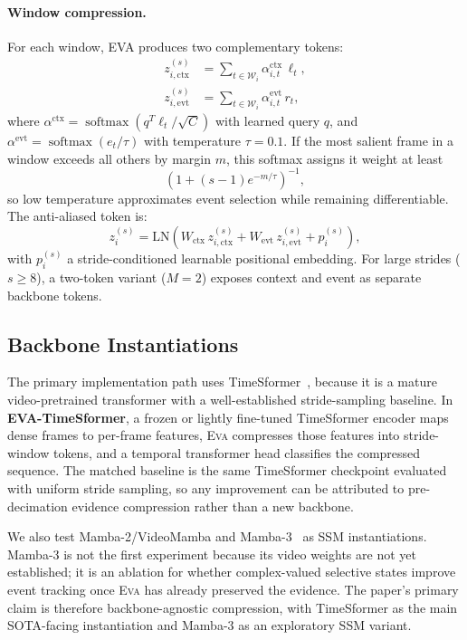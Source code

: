 \documentclass[10pt,twocolumn]{article}
\newcommand{\EVA}{\textsc{Eva}}
\begin{document}
\paragraph{Window compression.}
For each window, EVA produces two complementary tokens:
\begin{align}
    z_{i,\mathrm{ctx}}^{(s)} &= \sum_{t \in \mathcal{W}_i} \alpha_{i,t}^{\mathrm{ctx}}\, \ell_t, \\
    z_{i,\mathrm{evt}}^{(s)} &= \sum_{t \in \mathcal{W}_i} \alpha_{i,t}^{\mathrm{evt}}\, r_t,
\end{align}
where $\alpha^{\mathrm{ctx}} = \operatorname{softmax}(q^T\ell_t/\sqrt{C})$
with learned query $q$, and $\alpha^{\mathrm{evt}} = \operatorname{softmax}(e_t/\tau)$
with temperature $\tau{=}0.1$.
If the most salient frame in a window exceeds all others by margin $m$, this
softmax assigns it weight at least
\[
    \left(1 + (s-1)e^{-m/\tau}\right)^{-1},
\]
so low temperature approximates event selection while remaining differentiable.
The anti-aliased token is:
\begin{equation}
    z_i^{(s)} = \mathrm{LN}\!\left(W_{\mathrm{ctx}}\, z_{i,\mathrm{ctx}}^{(s)}
        + W_{\mathrm{evt}}\, z_{i,\mathrm{evt}}^{(s)} + p_i^{(s)}\right),
\end{equation}
with $p_i^{(s)}$ a stride-conditioned learnable positional embedding.
For large strides ($s \geq 8$), a two-token variant ($M{=}2$) exposes context
and event as separate backbone tokens.

\subsection{Backbone Instantiations}

The primary implementation path uses TimeSformer~\cite{timesformer}, because it
is a mature video-pretrained transformer with a well-established stride-sampling
baseline. In \textbf{EVA-TimeSformer}, a frozen or lightly fine-tuned TimeSformer
encoder maps dense frames to per-frame features, \EVA{} compresses those features
into stride-window tokens, and a temporal transformer head classifies the
compressed sequence. The matched baseline is the same TimeSformer checkpoint
evaluated with uniform stride sampling, so any improvement can be attributed to
pre-decimation evidence compression rather than a new backbone.

We also test Mamba-2/VideoMamba and Mamba-3~\cite{mamba2,mamba3} as SSM
instantiations. Mamba-3 is not the first experiment because its video weights are
not yet established; it is an ablation for whether complex-valued selective
states improve event tracking once \EVA{} has already preserved the evidence.
The paper's primary claim is therefore backbone-agnostic compression, with
TimeSformer as the main SOTA-facing instantiation and Mamba-3 as an exploratory
SSM variant.
\end{document}

